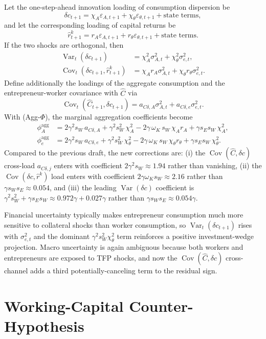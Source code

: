 \documentclass[11pt]{article}
\newcommand{\Var}{\operatorname{Var}}
\newcommand{\Cov}{\operatorname{Cov}}
\theoremstyle{plain}
\theoremstyle{definition}
\begin{document}
Let the one-step-ahead innovation loading of consumption dispersion be
\[
\delta c_{t+1}
=
\chi_A\varepsilon_{A,t+1}
+\chi_\theta\varepsilon_{\theta,t+1}
+\text{state terms},
\]
and let the corresponding loading of capital returns be
\[
\hat r^k_{t+1}
=
r_A\varepsilon_{A,t+1}
+r_\theta\varepsilon_{\theta,t+1}
+\text{state terms}.
\]
If the two shocks are orthogonal, then
\begin{align}
\Var_t(\delta c_{t+1})
&=
\chi_A^2\sigma_{A,t}^2+\chi_\theta^2\sigma_{e,t}^2,\\
\Cov_t(\delta c_{t+1},\hat r^k_{t+1})
&=
\chi_A r_A\sigma_{A,t}^2+\chi_\theta r_\theta\sigma_{e,t}^2.
\end{align}
Define additionally the loadings of the aggregate consumption and the
entrepreneur-worker covariance with $\hat C$ via
\[
\Cov_t(\hat C_{t+1},\delta c_{t+1})
= a_{C\delta,A}\sigma_{A,t}^2 + a_{C\delta,e}\sigma_{e,t}^2.
\]
With (Agg-$\Phi$), the marginal aggregation coefficients become
\begin{align}
\phi_A^{\mathrm{agg}}
&= 2\gamma^2 s_W\, a_{C\delta,A}
+ \gamma^2 s_W^2\, \chi_A^2
- 2\gamma\,\omega_K\, s_W\, \chi_A r_A
+ \gamma s_E s_W\, \chi_A^2,
\tag{aggA}\\
\phi_e^{\mathrm{agg}}
&= 2\gamma^2 s_W\, a_{C\delta,e}
+ \gamma^2 s_W^2\, \chi_\theta^2
- 2\gamma\,\omega_K\, s_W\, \chi_\theta r_\theta
+ \gamma s_E s_W\, \chi_\theta^2.
\tag{agge}
\end{align}
Compared to the previous draft, the new corrections are: (i) the
$\Cov(\hat C,\delta c)$ cross-load $a_{C\delta,j}$ enters with coefficient
$2\gamma^2 s_W \approx 1.94$ rather than vanishing, (ii) the
$\Cov(\delta c,\hat r^k)$ load enters with coefficient
$2\gamma\omega_K s_W \approx 2.16$ rather than $\gamma s_W s_E \approx 0.054$,
and (iii) the leading $\Var(\delta c)$ coefficient is
$\gamma^2 s_W^2 + \gamma s_E s_W \approx 0.972\gamma + 0.027\gamma$ rather
than $\gamma s_W s_E \approx 0.054\gamma$.

Financial uncertainty typically makes entrepreneur consumption much more
sensitive to collateral shocks than worker consumption, so
$\Var_t(\delta c_{t+1})$ rises with $\sigma_{e,t}^2$ and the dominant
$\gamma^2 s_W^2 \chi_\theta^2$ term reinforces a positive investment-wedge
projection. Macro uncertainty is again ambiguous because both workers and
entrepreneurs are exposed to TFP shocks, and now the $\Cov(\hat C,\delta c)$
cross-channel adds a third potentially-canceling term to the residual sign.

\section{Working-Capital Counter-Hypothesis}
\end{document}
